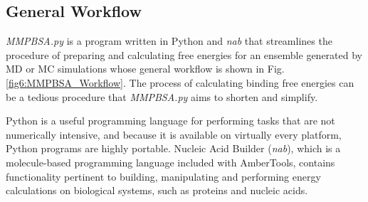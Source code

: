 \subsection{General Workflow}

\emph{MMPBSA.py} is a program written in Python and \emph{nab}
\cite{Macke_BookChap_MolModNucAcid_2000_p379} that streamlines the procedure of
preparing and calculating free energies for an ensemble generated by MD or MC
simulations whose general workflow is shown in Fig. \ref{fig6:MMPBSA_Workflow}.
The process of calculating binding free energies can be a tedious procedure that
\emph{MMPBSA.py} aims to shorten and simplify.

Python is a useful programming language for performing tasks that are not
numerically intensive, and because it is available on virtually every platform,
Python programs are highly portable. Nucleic Acid Builder (\emph{nab}),
\cite{Macke_BookChap_MolModNucAcid_2000_p379} which is a molecule-based
programming language included with AmberTools, contains functionality pertinent
to building, manipulating and performing energy calculations on biological
systems, such as proteins and nucleic acids.

